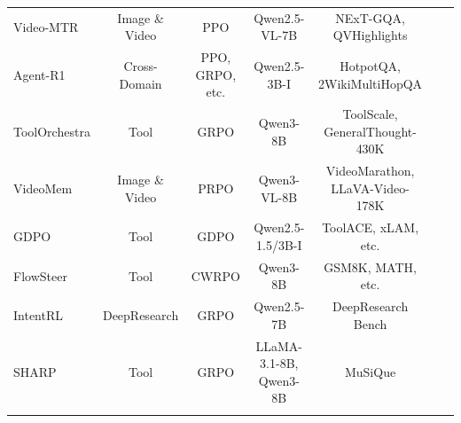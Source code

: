 \documentclass{llmxive}
\providecommand{\Result}{
  \begin{tikzpicture}[baseline=(char.base)]
    \fill[textgreen!50] (0,0) circle (0.18);
    \node[white, font=\scriptsize\rmfamily, inner sep=0pt] (char) at (0,0) {A};
  \end{tikzpicture}
}
\providecommand{\Format}{
  \begin{tikzpicture}[baseline=(char.base)]
    \fill[textred!50] (0,0) circle (0.18);
    \node[white, font=\scriptsize\rmfamily, inner sep=0pt] (char) at (0,0) {F};
  \end{tikzpicture}
}
\providecommand{\Efficient}{
  \begin{tikzpicture}[baseline=(char.base)]
    \fill[textyellow!50] (0,0) circle (0.18);
    \node[white, font=\scriptsize\rmfamily, inner sep=0pt] (char) at (0,0) {E};
  \end{tikzpicture}
}
\providecommand{\Process}{
  \begin{tikzpicture}[baseline=(char.base)]
    \fill[frameblue!50] (0,0) circle (0.18);
    \node[white, font=\scriptsize\rmfamily, inner sep=0pt] (char) at (0,0) {P};
  \end{tikzpicture}
}
\begin{document}
\begin{table}[]
{\begin{tabular}{lcccccc}
Video-MTR \cite{Video-MTR} &
  Image \& Video &
  PPO &
  Qwen2.5-VL-7B &
  NExT-GQA, QVHighlights &
  \Result\hspace{-0.4em}\Format\hspace{-0.4em}\Process \\

Agent-R1 \cite{Agent-R1} &
  Cross-Domain &
  PPO, GRPO, etc. &
  Qwen2.5-3B-I &
  HotpotQA, 2WikiMultiHopQA &
  \Result\hspace{-0.4em}\Process \\

ToolOrchestra \cite{ToolOrchestra} &
  Tool &
  GRPO &
  Qwen3-8B &
  ToolScale, GeneralThought-430K &
  \Result\hspace{-0.4em}\Efficient\hspace{-0.4em}\Process \\

VideoMem \cite{VideoMem} &
  Image \& Video &
  PRPO &
  Qwen3-VL-8B&
  VideoMarathon, LLaVA-Video-178K &
  \Result\hspace{-0.4em}\Process\hspace{-0.4em}\Efficient \\



GDPO \cite{GDPO} &
  Tool &
  GDPO &
  Qwen2.5-1.5/3B-I &
  ToolACE, xLAM, etc. &
  \Result\hspace{-0.4em}\Format \\

FlowSteer \cite{FlowSteer} &
  Tool &
  CWRPO &
  Qwen3-8B &
  GSM8K, MATH, etc. &
  \Result\hspace{-0.4em}\Format\hspace{-0.4em}\Process \\

IntentRL \cite{IntentRL} &
  DeepResearch &
  GRPO &
  Qwen2.5-7B &
  DeepResearch Bench &
  \Result\hspace{-0.4em}\Format\hspace{-0.4em}\Process\hspace{-0.4em}\Efficient \\



SHARP \cite{SHARP} &
  Tool &
   GRPO &
  LLaMA-3.1-8B, Qwen3-8B &
  MuSiQue &
  \Result\hspace{-0.4em}\Process \\

\midrule


\rowcolor{gray!10!white} \multicolumn{6}{c}{\textbf{\textit{Training Algorithm Optimization (\cref{sec:algorithmic_optimization})}}}\\



\end{tabular}}
\end{table}
\end{document}
